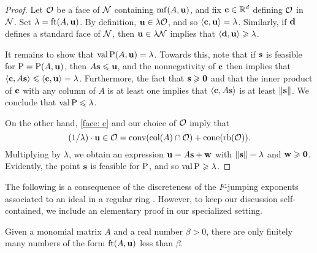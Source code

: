 \documentclass[11pt]{amsart}
\begin{document}
\begin{proof}
   Let $\mathcal{O}$ be a face of $\mathcal{N}$ containing $\operatorname{mf}(A,\mathbf{u})$, and fix $\mathbf{c} \in \mathbb{R}^d$ defining $\mathcal{O}$ in $\mathcal{N}$.
   Set $\lambda = \operatorname{ft}(A, \mathbf{u})$.
   By definition, $\mathbf{u} \in \lambda \mathcal{O}$, and so $\langle \mathbf{c}, \mathbf{u} \rangle = \lambda$.    Similarly, if $\mathbf{d}$ defines a standard face of $\mathcal{N}$, then $\mathbf{u} \in \lambda \mathcal{N}$ implies that $\langle \mathbf{d}, \mathbf{u} \rangle \geqslant \lambda$.

It remains to show that $\operatorname{val} \mathrm{P}(A, \mathbf{u}) = \lambda$.  Towards this, note that if $\mathbf{s}$ is feasible for $\mathrm{P} = \mathrm{P}(A, \mathbf{u})$, then $A \mathbf{s} \leqslant \mathbf{u}$, and the nonnegativity of $\mathbf{c}$ then implies that  $\langle \mathbf{c}, A \mathbf{s} \rangle \leqslant \langle \mathbf{c}, \mathbf{u} \rangle = \lambda$.  Furthermore, the fact that $\mathbf{s} \geqslant \mathbf{0}$ and that the inner product of $\mathbf{c}$ with any column of $A$ is at least one implies that $\langle \mathbf{c}, A \mathbf{s} \rangle$ is at least $\| \mathbf{s} \|$.  We conclude that $\operatorname{val} \mathrm{P} \leqslant \lambda$.  

On the other hand, \eqref{face: e} and our choice of $\mathcal{O}$ imply that 
\begin{equation}
\label{cone containment: e}
 (1/\lambda) \cdot \mathbf{u} \in \mathcal{O} = \operatorname{conv}(\operatorname{col}(A) \cap \mathcal{O}) + \operatorname{cone}(\operatorname{rb}(\mathcal{O})).
\end{equation}
Multiplying by $\lambda$, we obtain an expression $\mathbf{u} = A \mathbf{s} + \mathbf{w}$ with $\| \mathbf{s} \| = \lambda$ and $\mathbf{w} \geqslant \mathbf{0}$.
Evidently, the point $\mathbf{s}$ is feasible for $\mathrm{P}$, and so $\operatorname{val} \mathrm{P} \geqslant \lambda$.
\end{proof}


The following is a consequence of the discreteness of the $F$-jumping exponents associated to an ideal in a regular ring \cite[Theorem~3.1]{blickle+mustata+smith.discr_rat_FPTs}.
However, to keep our discussion self-contained, we include an elementary proof in our specialized setting.


\begin{lemma}
\label{discreteness: L}
Given a monomial matrix $A$ and a real number $\beta > 0 $, there are only finitely many numbers of the form $\operatorname{ft}(A, \mathbf{u})$ less than $\beta$.    
\end{lemma}
\end{document}
